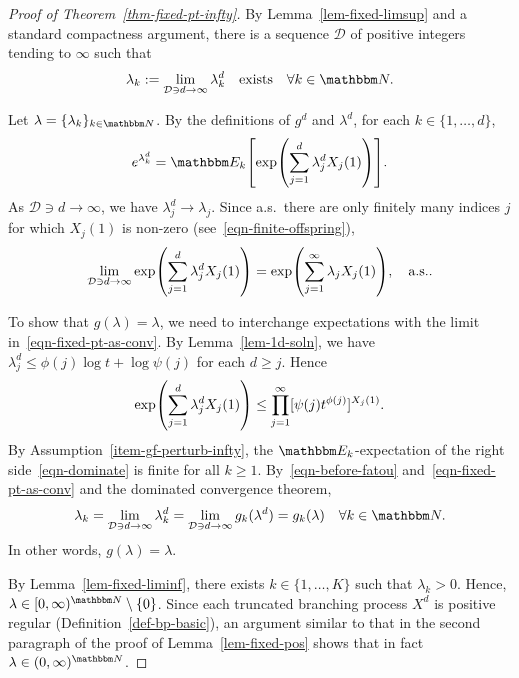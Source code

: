 \documentclass[11pt]{article}
\theoremstyle{plain}
\theoremstyle{definition}
\numberwithin{equation}{section}
\newcommand{\eqb}{\begin{equation}}
\newcommand{\eqe}{\end{equation}}
\newcommand{\eqbn}{\begin{equation*}}
\newcommand{\eqen}{\end{equation*}}
\newcommand{\BB}{\mathbbm}
\newcommand{\mcl}{\mathcal}
\let\originalleft\left
\let\originalright\right
\renewcommand{\left}{\mathopen{}\mathclose\bgroup\originalleft}
\renewcommand{\right}{\aftergroup\egroup\originalright}
\begin{document}
\begin{proof}[Proof of Theorem~\ref{thm-fixed-pt-infty}]
By Lemma~\ref{lem-fixed-limsup} and a standard compactness argument, there is a sequence $\mcl D$ of positive integers tending to $\infty$ such that
\eqb \label{eqn-ssl}
\lambda_k := \lim_{\mcl D \ni d\to\infty} \lambda_k^d \quad \text{exists} \quad \forall k \in \BB N .
\eqe 

Let $\lambda = \{\lambda_k\}_{k\in\BB N}$. 
By the definitions of $g^d$ and $\lambda^d$, for each $k\in \{1,\dots,d\}$, 
\eqb \label{eqn-before-fatou} 
e^{\lambda_k^d } = \BB E_k\left[ \exp\left( \sum_{j=1}^d \lambda_j^d X_j(1) \right) \right] .
\eqe 
As $\mcl D \ni d \to \infty$, we have $\lambda_j^d \to \lambda_j$. Since a.s.\ there are only finitely many indices $j$ for which $X_j(1)$ is non-zero (see~\eqref{eqn-finite-offspring}), 
\eqb  \label{eqn-fixed-pt-as-conv}
\lim_{\mcl D \ni d \to\infty} \exp\left( \sum_{j=1}^d \lambda_j^d X_j(1) \right) = \exp\left( \sum_{j=1}^\infty \lambda_j X_j(1) \right) ,\quad \text{a.s.} .
\eqe 


To show that $g (\lambda) = \lambda$, we need to interchange expectations with the limit in~\eqref{eqn-fixed-pt-as-conv}.  
By Lemma~\ref{lem-1d-soln}, we have $\lambda_j^d \leq \phi(j) \log t  + \log\psi(j)$ for each $d\geq j $. Hence
\eqb  \label{eqn-dominate}
\exp\left( \sum_{j=1}^d \lambda_j^d X_j(1) \right)
\leq \prod_{j=1}^\infty [ \psi(j) t^{\phi(j)}]^{X_j(1)} .
\eqe 
By Assumption~\ref{item-gf-perturb-infty}, the $\BB E_k$-expectation of the right side~\eqref{eqn-dominate} is finite for all $k\geq 1$. By~\eqref{eqn-before-fatou} and~\eqref{eqn-fixed-pt-as-conv} and the dominated convergence theorem, 
\eqbn
\lambda_k = \lim_{\mcl D \ni d \to\infty}  \lambda_k^d  =  \lim_{\mcl D \ni d \to\infty}  g_k(\lambda^d)  = g_k(\lambda) \quad \forall k \in \BB N . 
\eqen
In other words, $g(\lambda) = \lambda$. 
 
By Lemma~\ref{lem-fixed-liminf}, there exists $k \in \{1,\dots,K\}$ such that $\lambda_k > 0$. Hence, $\lambda \in [0,\infty)^{\BB N}\setminus \{0\}$. Since each truncated branching process $X^d$ is positive regular (Definition~\ref{def-bp-basic}), an argument similar to that in the second paragraph of the proof of Lemma~\ref{lem-fixed-pos} shows that in fact $\lambda \in (0,\infty)^{\BB N}$. 
\end{proof}
 
\end{document}
